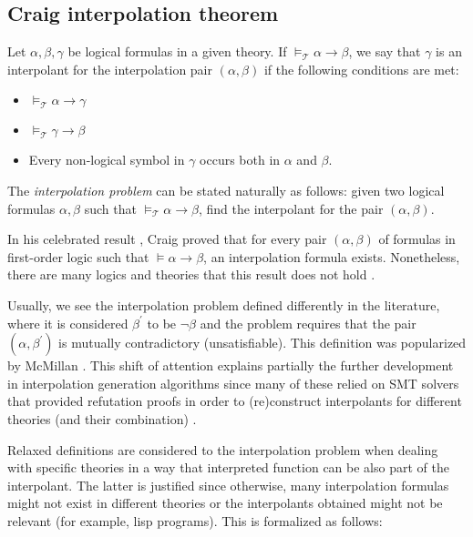\subsection{Craig interpolation theorem}

Let $\alpha, \beta, \gamma$ be logical formulas in a given theory. If
$\models_{\mathcal{T}} \alpha \rightarrow \beta$, we say that $\gamma$ is an
interpolant for the interpolation pair $(\alpha, \beta)$ if the following conditions
are met:

\begin{itemize}
\item $\models_{\mathcal{T}} \alpha \rightarrow \gamma$
\item $\models_{\mathcal{T}} \gamma \rightarrow \beta$
\item Every non-logical symbol in $\gamma$ occurs both in $\alpha$ and
  $\beta$.
\end{itemize}

The \emph{interpolation problem} can be stated naturally as 
follows: given two logical formulas $\alpha, \beta$ such that 
$\models_{\mathcal{T}} \alpha \rightarrow \beta$, find
the interpolant for the pair $(\alpha, \beta)$.

In his celebrated result \cite{10.2307/2963594}, Craig proved that for every pair
$(\alpha, \beta)$ of formulas in first-order logic such that
$\models \alpha \rightarrow \beta$, an interpolation formula exists. Nonetheless,
there are many logics and theories that this result does not hold \cite{komori1978}.

Usually, we see the interpolation problem defined differently in the literature, 
where it is considered $\beta^{'}$ to be $\neg \beta$ and 
the problem requires that the pair $(\alpha, \beta^{'})$
is mutually contradictory (unsatisfiable). This definition was popularized by 
McMillan \cite{10.1007/978-3-540-24730-2_2}. This shift of attention explains 
partially the further development in interpolation generation algorithms 
since many of these relied on SMT solvers that provided refutation proofs 
in order to (re)construct interpolants for different theories (and their 
combination) \cite{10.1007/978-3-642-02959-2_17, 
10.1007/978-3-642-36742-7_9, mcmillan2011interpolants}.

Relaxed definitions are considered to the interpolation 
problem when dealing with specific
theories \cite{10.1007/11532231_26} in a way that interpreted 
function can be also part of the interpolant. The latter is 
justified since otherwise, many interpolation formulas might not exist
in different theories or the interpolants obtained might not 
be relevant (for example, lisp programs). This is formalized as follows:

